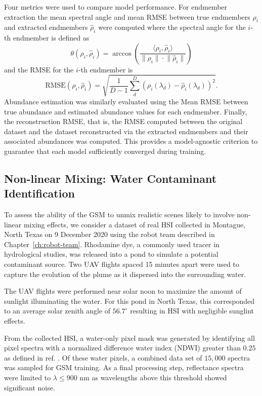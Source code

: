 Four metrics were used to compare model performance. For endmember extraction
the mean spectral angle and mean RMSE between true endmembers $\rho_i$ and
extracted endmembers $\hat{\rho}_i$ were computed where the spectral angle for
the $i$-th endmember is defined as
\begin{equation}
    \theta(\rho_i, \hat{\rho}_i) =  \arccos\left( \dfrac{\langle \rho_i, \hat{\rho}_i \rangle}{\lVert \rho_i \rVert \cdot \lVert \hat{\rho}_i \rVert}\right)
\end{equation}
and the RMSE for the $i$-th endmember is
\begin{equation}
    \text{RMSE}(\rho_i, \hat{\rho}_i) = \sqrt{\frac{1}{D-1}\sum_d^D\left(\rho_i(\lambda_d) - \hat{\rho}_i(\lambda_d) \right)^2}.
\end{equation}
Abundance estimation was similarly evaluated using the Mean RMSE between true
abundance and estimated abundance values for each endmember. Finally, the
reconstruction RMSE, that is, the RMSE computed between the original dataset
and the dataset reconstructed via the extracted endmembers and their associated
abundances was computed. This provides a model-agnostic criterion to guarantee
that each model sufficiently converged during training.

\subsection{Non-linear Mixing: Water Contaminant Identification}\label{sec:real-experiments}

To assess the ability of the GSM to unmix realistic scenes likely to involve
non-linear mixing effects, we consider a dataset of real HSI collected in
Montague, North Texas on 9 December 2020 using the robot team described in
Chapter~\ref{ch:robot-team}. Rhodamine dye, a commonly used tracer in
hydrological studies, was released into a pond to simulate a potential
contaminant source. Two UAV flights spaced 15 minutes apart were used to capture
the evolution of the plume as it dispersed into the surrounding water.

The UAV flights were performed near solar noon to maximize the amount of
sunlight illuminating the water. For this pond in North Texas, this corresponded
to an average solar zenith angle of $56.7^{\circ}$ resulting in HSI with
negligible sunglint effects.

From the collected HSI, a water-only pixel mask was generated by identifying all
pixel spectra with a normalized difference water index (NDWI) greater than
$0.25$ as defined in ref. \cite{ndwi}. Of these water pixels, a combined data
set of $15,000$ spectra was sampled for GSM training. As a final processing
step, reflectance spectra were limited to $\lambda \leq 900$ nm as wavelengths
above this threshold showed significant noise.

